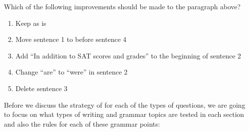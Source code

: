 \bigskip

\bigskip
Which of the following improvements should be made to the paragraph above?

\begin{enumerate}[label=(\Alph*)]\itemsep-0.4em    %
\item{Keep as is}
\item{Move sentence 1 to before sentence 4}
\item{Add “In addition to SAT scores and grades” to the beginning of sentence 2}
\item{Change “are” to “were” in sentence 2}
\item{Delete sentence 3 }
\end{enumerate}

\pagebreak

Before we discuss the strategy of for each of the types of questions, we are going to focus on what types of writing and grammar topics are tested in each section and also the rules for each of these grammar points: 


